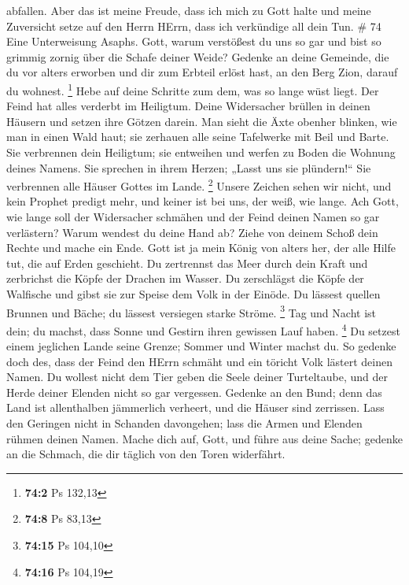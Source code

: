 abfallen.  Aber das ist meine Freude, dass ich mich zu Gott
halte und meine Zuversicht setze auf den Herrn HErrn, dass ich
verkündige all dein Tun. \# 74  Eine Unterweisung Asaphs.
Gott, warum verstößest du uns so gar und bist so grimmig zornig über die
Schafe deiner Weide?  Gedenke an deine Gemeinde, die du vor
alters erworben und dir zum Erbteil erlöst hast, an den Berg Zion,
darauf du wohnest. \footnote{\textbf{74:2} Ps 132,13}  Hebe
auf deine Schritte zum dem, was so lange wüst liegt. Der Feind hat alles
verderbt im Heiligtum.  Deine Widersacher brüllen in deinen
Häusern und setzen ihre Götzen darein.  Man sieht die Äxte
obenher blinken, wie man in einen Wald haut;  sie zerhauen
alle seine Tafelwerke mit Beil und Barte.  Sie verbrennen
dein Heiligtum; sie entweihen und werfen zu Boden die Wohnung deines
Namens.  Sie sprechen in ihrem Herzen; „Lasst uns sie
plündern!{}`` Sie verbrennen alle Häuser Gottes im Lande. \footnote{\textbf{74:8}
  Ps 83,13}  Unsere Zeichen sehen wir nicht, und kein
Prophet predigt mehr, und keiner ist bei uns, der weiß, wie lange.
 Ach Gott, wie lange soll der Widersacher schmähen und der
Feind deinen Namen so gar verlästern?  Warum wendest du
deine Hand ab? Ziehe von deinem Schoß dein Rechte und mache ein Ende.
 Gott ist ja mein König von alters her, der alle Hilfe tut,
die auf Erden geschieht.  Du zertrennst das Meer durch dein
Kraft und zerbrichst die Köpfe der Drachen im Wasser.  Du
zerschlägst die Köpfe der Walfische und gibst sie zur Speise dem Volk in
der Einöde.  Du lässest quellen Brunnen und Bäche; du
lässest versiegen starke Ströme. \footnote{\textbf{74:15} Ps 104,10}
 Tag und Nacht ist dein; du machst, dass Sonne und Gestirn
ihren gewissen Lauf haben. \footnote{\textbf{74:16} Ps 104,19}
 Du setzest einem jeglichen Lande seine Grenze; Sommer und
Winter machst du.  So gedenke doch des, dass der Feind den
HErrn schmäht und ein töricht Volk lästert deinen Namen. 
Du wollest nicht dem Tier geben die Seele deiner Turteltaube, und der
Herde deiner Elenden nicht so gar vergessen.  Gedenke an
den Bund; denn das Land ist allenthalben jämmerlich verheert, und die
Häuser sind zerrissen.  Lass den Geringen nicht in Schanden
davongehen; lass die Armen und Elenden rühmen deinen Namen.
 Mache dich auf, Gott, und führe aus deine Sache; gedenke
an die Schmach, die dir täglich von den Toren widerfährt. 
